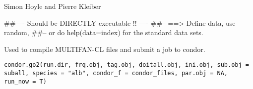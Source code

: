 \documentclass[a4paper]{book}
\begin{document}
\begin{Arguments}
\begin{ldescription}
\item[\code{run.dir}] 


\item[\code{frq.obj}] 


\item[\code{tag.obj}] 


\item[\code{doitall.obj}] 


\item[\code{ini.obj}] 


\item[\code{sub.obj}] 


\item[\code{species}] 


\item[\code{condor\_f}] 


\item[\code{par.obj}] 


\item[\code{run\_now}] 


\item[\code{fixpermissions}] 


\end{ldescription}
\end{Arguments}
%
\begin{Author}\relax
Simon Hoyle and Pierre Kleiber

\end{Author}
%
\begin{Examples}
\begin{ExampleCode}
##---- Should be DIRECTLY executable !! ----
##-- ==>  Define data, use random,
##--	or do  help(data=index)  for the standard data sets.

\end{ExampleCode}
\end{Examples}
%
\begin{Description}\relax

Used to compile MULTIFAN-CL files and submit a job to condor. 
\end{Description}
%
\begin{Usage}
\begin{verbatim}
condor.go2(run.dir, frq.obj, tag.obj, doitall.obj, ini.obj, sub.obj = suball, species = "alb", condor_f = condor_files, par.obj = NA, run_now = T)
\end{verbatim}
\end{Usage}
\end{document}

